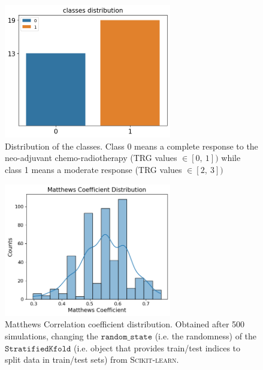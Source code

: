 \documentclass{standalone}
\begin{document}
\begin{figure}[ht]

    \centering
    \includegraphics[width=0.65\textwidth]{../images/classesdistrib.png}

    \caption{Distribution of the classes. Class 0 means a complete response to the neo-adjuvant chemo-radiotherapy (TRG values $ \in [0, \: 1])$ while class 1 means a moderate response (TRG values $ \in [2, \: 3])$ }
    \label{classesdistrib}
    
    \end{figure}

    \begin{figure}[ht]

        \centering
        \includegraphics[width=0.65\textwidth]{../images/MCC.png}
    
        \caption{Matthews Correlation coefficient distribution. Obtained after 500 simulations, changing the $\mathtt{random\_state}$ (i.e. the randomness) of the $\mathtt{StratifiedKfold}$ (i.e. object that provides train/test indices to split data in train/test sets) from \textsc{Scikit-learn}.}
        \label{MCC}
        
        \end{figure}
\end{document}
